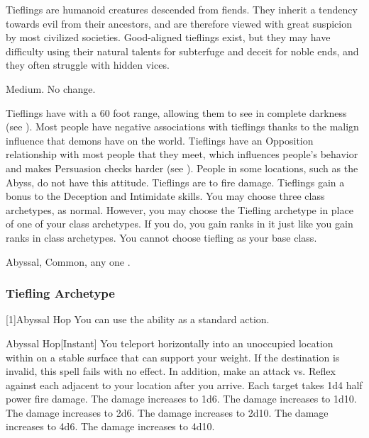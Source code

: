         Tieflings are humanoid creatures descended from fiends.
        They inherit a tendency towards evil from their ancestors, and are therefore viewed with great suspicion by most civilized societies.
        Good-aligned tieflings exist, but they may have difficulty using their natural talents for subterfuge and deceit for noble ends, and they often struggle with hidden vices.

         Medium.
         No change.
        \begin{itemize}
             Tieflings have  with a 60 foot range, allowing them to see in complete darkness (see ).
             Most people have negative associations with tieflings thanks to the malign influence that demons have on the world.
                Tieflings have an Opposition relationship with most people that they meet, which influences people's behavior and makes Persuasion checks harder (see ).
                People in some locations, such as the Abyss, do not have this attitude.
             Tieflings are  to fire damage.
             Tieflings gain a  bonus to the Deception and Intimidate skills.
             You may choose three class archetypes, as normal.
                However, you may choose the Tiefling archetype in place of one of your class archetypes.
                If you do, you gain ranks in it just like you gain ranks in class archetypes.
                You cannot choose tiefling as your base class.
        \end{itemize}
         Abyssal, Common, any one .

        \subsubsection{Tiefling Archetype}
            [1]{Abyssal Hop} You can use the  ability as a standard action.
            \begin{freeability}{Abyssal Hop}[Instant]
                \rankline
                You teleport horizontally into an unoccupied location within \shortrange on a stable surface that can support your weight.
                If the destination is invalid, this spell fails with no effect.
                In addition, make an attack vs. Reflex against each  adjacent to your location after you arrive.
                \hit Each target takes 1d4 \add half power fire damage.
                \rankline
                 The damage increases to 1d6.
                 The damage increases to 1d10.
                 The damage increases to 2d6.
                 The damage increases to 2d10.
                 The damage increases to 4d6.
                 The damage increases to 4d10.
            \end{freeability}

